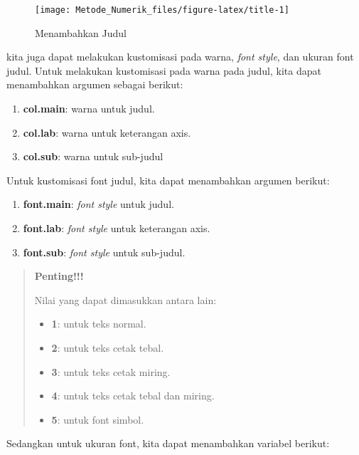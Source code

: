 \documentclass[
]{book}
\providecommand{\tightlist}{%
  \setlength{\itemsep}{0pt}\setlength{\parskip}{0pt}}
\theoremstyle{definition}
\theoremstyle{definition}
\theoremstyle{definition}
\theoremstyle{definition}
\theoremstyle{remark}
\begin{document}
\begin{figure}

{\centering \texttt{[image: Metode\_Numerik\_files/figure-latex/title-1]} 

}

\caption{Menambahkan Judul}\label{fig:title}
\end{figure}

kita juga dapat melakukan kustomisasi pada warna, \emph{font style}, dan ukuran font judul. Untuk melakukan kustomisasi pada warna pada judul, kita dapat menambahkan argumen sebagai berikut:

\begin{enumerate}
\def\labelenumi{\alph{enumi}.}
\tightlist
\item
  \textbf{col.main}: warna untuk judul.
\item
  \textbf{col.lab}: warna untuk keterangan axis.
\item
  \textbf{col.sub}: warna untuk sub-judul
\end{enumerate}

Untuk kustomisasi font judul, kita dapat menambahkan argumen berikut:

\begin{enumerate}
\def\labelenumi{\alph{enumi}.}
\tightlist
\item
  \textbf{font.main}: \emph{font style} untuk judul.
\item
  \textbf{font.lab}: \emph{font style} untuk keterangan axis.
\item
  \textbf{font.sub}: \emph{font style} untuk sub-judul.
\end{enumerate}

\begin{quote}
\textbf{Penting!!!}

Nilai yang dapat dimasukkan antara lain:

\begin{itemize}
\tightlist
\item
  \textbf{1}: untuk teks normal.
\item
  \textbf{2}: untuk teks cetak tebal.
\item
  \textbf{3}: untuk teks cetak miring.
\item
  \textbf{4}: untuk teks cetak tebal dan miring.
\item
  \textbf{5}: untuk font simbol.
\end{itemize}
\end{quote}

Sedangkan untuk ukuran font, kita dapat menambahkan variabel berikut:
\end{document}
